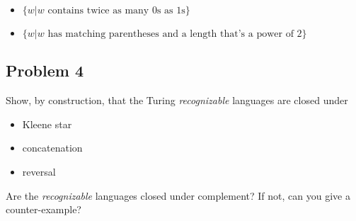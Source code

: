 \documentclass[11pt]{article}
\begin{document}
\begin{itemize}
\item $\{ w | w \text{ contains twice as many 0s as 1s} \}$
\item $\{ w | w \text{ has matching parentheses and a length that's a power of 2}\}$
\end{itemize}

\subsection{Problem 4}
\label{sec-1-4}
Show, by construction, that the Turing \emph{recognizable} languages are closed under

\begin{itemize}
\item Kleene star
\item concatenation
\item reversal
\end{itemize}

Are the \emph{recognizable} languages closed under complement? If not, can you give a counter-example?
\end{document}
